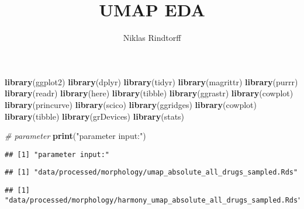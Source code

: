 \documentclass[
]{article}
\title{UMAP EDA}
\author{Niklas Rindtorff}
\date{}
\newenvironment{Shaded}{\begin{snugshade}}{\end{snugshade}}
\newcommand{\CommentTok}[1]{\textcolor[rgb]{0.56,0.35,0.01}{\textit{#1}}}
\newcommand{\KeywordTok}[1]{\textcolor[rgb]{0.13,0.29,0.53}{\textbf{#1}}}
\newcommand{\NormalTok}[1]{#1}
\newcommand{\OperatorTok}[1]{\textcolor[rgb]{0.81,0.36,0.00}{\textbf{#1}}}
\newcommand{\StringTok}[1]{\textcolor[rgb]{0.31,0.60,0.02}{#1}}
\begin{document}
\maketitle

\begin{Shaded}
\begin{Highlighting}[]
\KeywordTok{library}\NormalTok{(ggplot2)}
\KeywordTok{library}\NormalTok{(dplyr)}
\KeywordTok{library}\NormalTok{(tidyr)}
\KeywordTok{library}\NormalTok{(magrittr)}
\KeywordTok{library}\NormalTok{(purrr)}
\KeywordTok{library}\NormalTok{(readr)}
\KeywordTok{library}\NormalTok{(here)}
\KeywordTok{library}\NormalTok{(tibble)}
\KeywordTok{library}\NormalTok{(ggrastr)}
\KeywordTok{library}\NormalTok{(cowplot)}
\KeywordTok{library}\NormalTok{(princurve)}
\KeywordTok{library}\NormalTok{(scico)}
\KeywordTok{library}\NormalTok{(ggridges)}
\KeywordTok{library}\NormalTok{(cowplot)}
\KeywordTok{library}\NormalTok{(tibble)}
\KeywordTok{library}\NormalTok{(grDevices)}
\KeywordTok{library}\NormalTok{(stats)}

\CommentTok{# parameter}
\KeywordTok{print}\NormalTok{(}\StringTok{"parameter input:"}\NormalTok{)}
\end{Highlighting}
\end{Shaded}

\begin{verbatim}
## [1] "parameter input:"
\end{verbatim}

\begin{Shaded}
\end{Shaded}

\begin{verbatim}
## [1] "data/processed/morphology/umap_absolute_all_drugs_sampled.Rds"
\end{verbatim}

\begin{Shaded}
\end{Shaded}

\begin{verbatim}
## [1] "data/processed/morphology/harmony_umap_absolute_all_drugs_sampled.Rds"
\end{verbatim}
\end{document}
